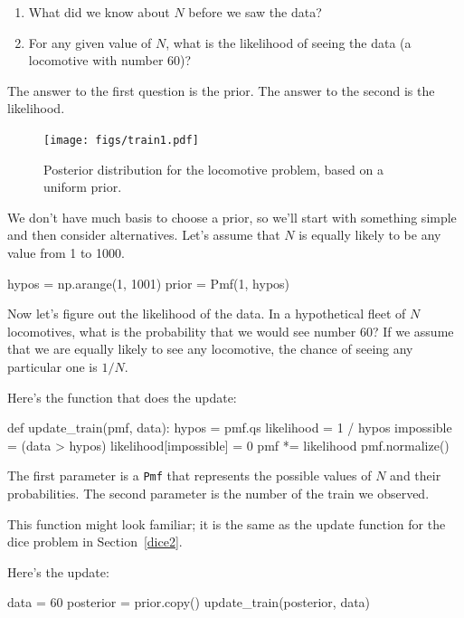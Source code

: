 \documentclass[12pt]{book}
\theoremstyle{exercise}
\newcommand{\py}[1]{{\tt #1}}%
\begin{document}
\begin{enumerate}

\item What did we know about $N$ before we saw the data?

\item For any given value of $N$, what is the likelihood of
seeing the data (a locomotive with number 60)?

\end{enumerate}

The answer to the first question is the prior.  The answer to the
second is the likelihood.

\begin{figure}
\centerline{\texttt{[image: figs/train1.pdf]}}
\caption{Posterior distribution for the locomotive problem, based
on a uniform prior.}
\label{fig.train1}
\end{figure}

We don't have much basis to choose a prior, so we'll start with
something simple and then consider alternatives.
Let's assume that $N$ is equally likely to be any value from 1 to 1000.

\begin{code}
hypos = np.arange(1, 1001)
prior = Pmf(1, hypos)
\end{code}

Now let's figure out the likelihood of the data.
In a hypothetical fleet of $N$ locomotives, what is the probability that we would see number 60?
If we assume that we are equally likely to see any locomotive, the chance of seeing any particular one is $1/N$.

Here's the function that does the update:

\begin{code}
def update_train(pmf, data):
    hypos = pmf.qs
    likelihood = 1 / hypos
    impossible = (data > hypos)
    likelihood[impossible] = 0
    pmf *= likelihood
    pmf.normalize()
\end{code}

The first parameter is a \py{Pmf} that represents the possible values of $N$ and their probabilities.
The second parameter is the number of the train we observed.

This function might look familiar; it is the same as the update function for the dice problem in Section~\ref{dice2}.


Here's the update:

\begin{code}
data = 60
posterior = prior.copy()
update_train(posterior, data)
\end{code}
\end{document}
